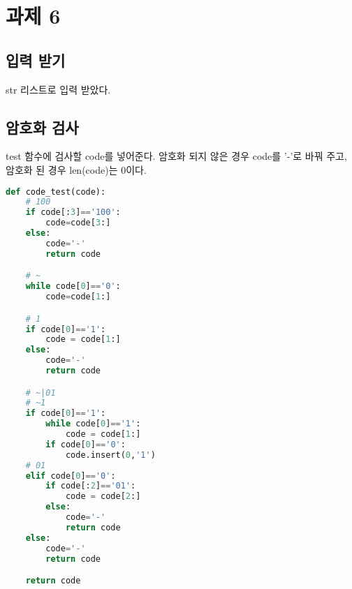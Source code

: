 \documentclass{article}
\begin{document}
	\section{과제 6}
	\subsection{입력 받기}
	str 리스트로 입력 받았다.
	\subsection{암호화 검사}
	test 함수에 검사할 code를 넣어준다. 암호화 되지 않은 경우 code를 '-'로 바꿔 주고, 암호화 된 경우 len(code)는 0이다.
	\begin{lstlisting}[language=Python]
def code_test(code):
	# 100
	if code[:3]=='100':
		code=code[3:]
	else:
		code='-'
		return code

	# ~
	while code[0]=='0':
		code=code[1:]

	# 1
	if code[0]=='1':
		code = code[1:]
	else:
		code='-'
		return code

	# ~|01
	# ~1
	if code[0]=='1':
		while code[0]=='1':
			code = code[1:]
		if code[0]=='0':
			code.insert(0,'1')
	# 01
	elif code[0]=='0':
		if code[:2]=='01':
			code = code[2:]
		else:
			code='-'
			return code
	else:
		code='-'
		return code

	return code
	\end{lstlisting}
	 
	
	
	
\end{document}
